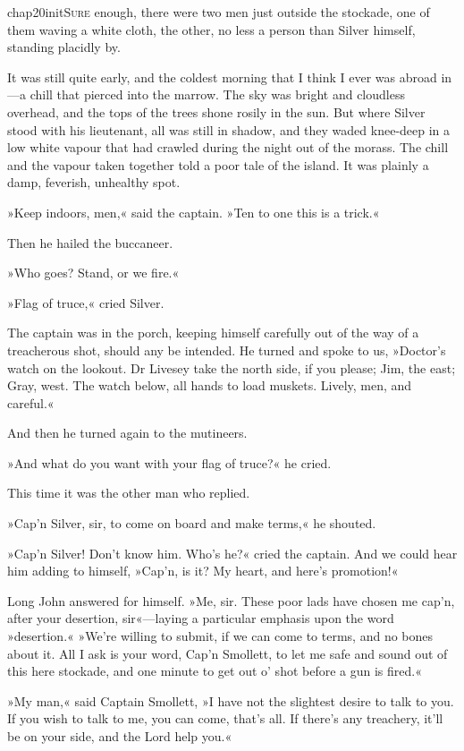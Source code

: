 
   \lettrine[lines=4,image=true]{chap20initS}{ure} enough, there were two men just outside the stockade, one of them waving a white cloth, the other, no less a person than Silver himself, standing placidly by.

It was still quite early, and the coldest morning that I think I ever was abroad in—a chill that pierced into the marrow. The sky was bright and cloudless overhead, and the tops of the trees shone rosily in the sun. But where Silver stood with his lieutenant, all was still in shadow, and they waded knee-deep in a low white vapour that had crawled during the night out of the morass. The chill and the vapour taken together told a poor tale of the island. It was plainly a damp, feverish, unhealthy spot.

»Keep indoors, men,« said the captain. »Ten to one this is a trick.«

Then he hailed the buccaneer.

»Who goes? Stand, or we fire.«

»Flag of truce,« cried Silver.

The captain was in the porch, keeping himself carefully out of the way of a treacherous shot, should any be intended. He turned and spoke to us, »Doctor's watch on the lookout. Dr Livesey take the north side, if you please; Jim, the east; Gray, west. The watch below, all hands to load muskets. Lively, men, and careful.«

And then he turned again to the mutineers.

»And what do you want with your flag of truce?« he cried.

This time it was the other man who replied.

»Cap'n Silver, sir, to come on board and make terms,« he shouted.

»Cap'n Silver! Don't know him. Who's he?« cried the captain. And we could hear him adding to himself, »Cap'n, is it? My heart, and here's promotion!«

Long John answered for himself. »Me, sir. These poor lads have chosen me cap'n, after your desertion, sir«—laying a particular emphasis upon the word »desertion.« »We're willing to submit, if we can come to terms, and no bones about it. All I ask is your word, Cap'n Smollett, to let me safe and sound out of this here stockade, and one minute to get out o' shot before a gun is fired.«

»My man,« said Captain Smollett, »I have not the slightest desire to talk to you. If you wish to talk to me, you can come, that's all. If there's any treachery, it'll be on your side, and the Lord help you.«

